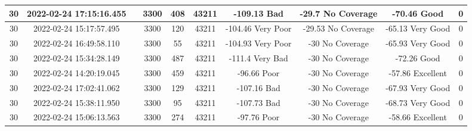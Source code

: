 \begin{longtable*}{|c|c|c|c|c|c|c|c|c|c|}
30&2022-02-24 17:15:16.455&&3300&408&43211& -109.13   Bad         & -29.7     No Coverage & -70.46    Good        & 0\\\hline
{}30&2022-02-24 15:17:57.495&&3300&120&43211& -104.46   Very Poor   & -29.53    No Coverage & -65.13    Very Good   & 0\\\hline
{}30&2022-02-24 16:49:58.110&&3300&55&43211& -104.93   Very Poor   & -30       No Coverage & -65.93    Very Good   & 0\\\hline
{}30&2022-02-24 15:34:28.149&&3300&487&43211& -111.4    Very Bad    & -30       No Coverage & -72.26    Good        & 0\\\hline
{}30&2022-02-24 14:20:19.045&&3300&459&43211& -96.66    Poor        & -30       No Coverage & -57.86    Excellent   & 0\\\hline
{}30&2022-02-24 17:02:41.062&&3300&129&43211& -107.16   Bad         & -30       No Coverage & -67.93    Very Good   & 0\\\hline
{}30&2022-02-24 15:38:11.950&&3300&95&43211& -107.73   Bad         & -30       No Coverage & -68.73    Very Good   & 0\\\hline
{}30&2022-02-24 15:06:13.563&&3300&274&43211& -97.76    Poor        & -30       No Coverage & -58.66    Excellent   & 0\\\hline

\end{longtable*}
